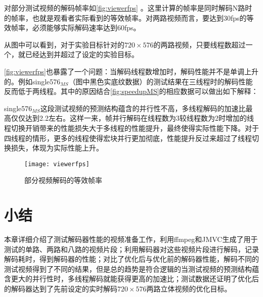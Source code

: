 对部分测试视频的解码帧率如\autoref{fig:viewerfps}%
。这里计算的帧率是同时解码N路时的帧率，也就是观看者实际看到的等效帧率。对两路视频而言，要达到30fps的等效帧率，必须能够实际解码速率达到60fps。

从图中可以看到，对于实验目标针对的$720\times 576$的两路视频，只要线程数超过一个，就已经达到并超过了设定的实验目标。

\autoref{fig:viewerfps}也暴露了一个问题：当解码线程数增加时，解码性能并不是单调上升的。例如single576$_{MS}$（图中黑色实底纹数据）的测试结果在三线程时的解码性能反而低于两线程。其中的原因结合\autoref{fig:speedupMS}的相应数据可以做出如下解释：

single576$_{MS}$这段测试视频的预测结构蕴含的并行性不高，多线程解码的加速比最高仅仅达到2.2左右。这样一来，帧并行解码在线程数为3较线程数为2时增加的线程切换开销带来的性能损失大于多线程的性能提升，最终使得实际性能下降。对于四线程的情形，更多的线程使得宏块并行更加彻底，性能提升反过来超过了线程切换损失，体现为实际性能上升。

\begin{figure}[htbp]
\begin{center}
\texttt{[image: viewerfps]}
\caption{部分视频解码的等效帧率}
\label{fig:viewerfps}
\end{center}
\end{figure}

\section{小结}
\label{sec:sum6}

本章详细介绍了测试解码器性能的视频准备工作，利用ffmpeg和JMVC生成了用于测试的单路、两路和八路的视频片段；利用解码器对这些视频片段进行解码，记录解码耗时，得到解码器的性能；对比了优化后与优化前的解码器性能，解码不同的测试视频得到了不同的结果，但是总的趋势是符合逻辑的{\pozhehao}当测试视频的预测结构蕴含更大的并行性时，多线程解码就能获得更高的加速比；测试数据还证明了优化后的解码器达到了先前设定的实时解码$720\times576$两路立体视频的优化目标。



%
%


